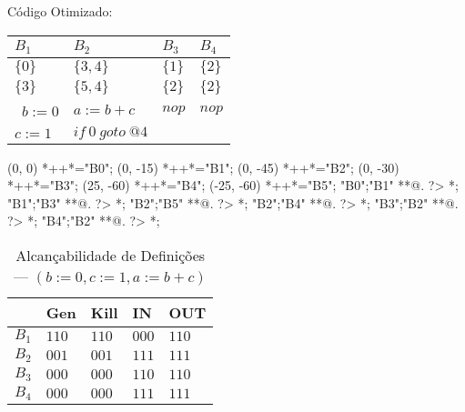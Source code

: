 C\'odigo Otimizado:

\begin{table}[ht]
\begin{scriptsize}
\begin{tabular}{l|l|l|l}
$B_{1}$ & $B_{2}$ & $B_{3}$ & $B_{4}$ \\
\hline
$\{0\}$ & $\{3, 4\}$ & $\{1\}$ & $\{2\}$ \\
$\{3\}$ & $\{5, 4\}$ & $\{2\}$ & $\{2\}$ \\
\hline\
$b:=0$ & $a:=b+c$ & $nop$ & $nop$ \\
$c:=1$ & $if\:0\:goto\:@4$ &  &  \\
\end{tabular}
\end{scriptsize}
\end{table}

\begin{scriptsize}
\xy(0, 0)
	*++{}*\frm{-,}="B0";
(0, -15)
	*++{}*\frm{-,}="B1";
(0, -45)
	*++{}*\frm{-,}="B2";
(0, -30)
	*++{}*\frm{-,}="B3";
(25, -60)
	*++{}*\frm{-,}="B4";
(-25, -60)
	*++{}*\frm{-,}="B5";
"B0";"B1" **@{.} ?> *{\dir{>}};
"B1";"B3" **@{.} ?> *{\dir{>}};
"B2";"B5" **@{.} ?> *{\dir{>}};
"B2";"B4" **@{.} ?> *{\dir{>}};
"B3";"B2" **@{.} ?> *{\dir{>}};
"B4";"B2" **@{.} ?> *{\dir{>}};
\endxy
\end{scriptsize}


\begin{table}[ht]
\centering
\begin{tabular}{l|l|l|l|l}
	& Gen & Kill & IN & OUT\\
\hline
$B_{1}$ &  $110$ & $110$ & $000$ & $110$\\
$B_{2}$ &  $001$ & $001$ & $111$ & $111$\\
$B_{3}$ &  $000$ & $000$ & $110$ & $110$\\
$B_{4}$ &  $000$ & $000$ & $111$ & $111$\\
\end{tabular}
\caption{Alcan\c{c}abilidade de Defini\c{c}\~oes --- $(b:=0, c:=1, a:=b+c)$}
\end{table}

